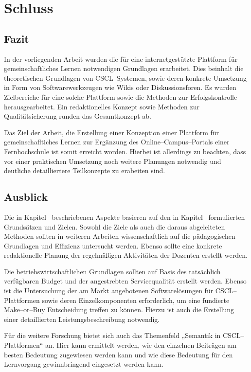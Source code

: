 \section{Schluss} %
\label{sec:schluss}

\subsection{Fazit} %
\label{sub:fazit}
In der vorliegenden Arbeit wurden die für eine internetgestützte Plattform für gemeinschaftliches Lernen notwendigen Grundlagen erarbeitet. Dies beinhalt die theoretischen Grundlagen von \ac{CSCL}–Systemen, sowie deren konkrete Umsetzung in Form von Softwarewerkzeugen wie Wikis oder Diskussionsforen. Es wurden Zielbereiche für eine solche Plattform sowie die Methoden zur Erfolgskontrolle herausgearbeitet. Ein redaktionelles Konzept sowie Methoden zur Qualitätsicherung runden das Gesamtkonzept ab.

Das Ziel der Arbeit, die Erstellung einer Konzeption einer Plattform für gemeinschafltiches Lernen zur Ergänzung des Online–Campus–Portals einer Fernhochschule ist somit erreicht worden. Hierbei ist allerdings zu beachten, dass vor einer praktischen Umsetzung noch weitere Planungen notwendig und deutliche detailliertere Teilkonzepte zu erabeiten sind. 

\subsection{Ausblick} %
\label{sub:ausblick}
Die in Kapitel~ beschriebenen Aspekte basieren auf den in Kapitel~ formulierten Grundsätzen und Zielen. Sowohl die Ziele als auch die daraus abgeleiteten Methoden sollten in weiteren Arbeiten wissenschaftlich auf die pädagogischen Grundlagen und Effizienz untersucht werden. Ebenso sollte eine konkrete redaktionelle Planung der regelmäßigen Aktivitäten der Dozenten erstellt werden.

Die betriebswirtschaftlichen Grundlagen sollten auf Basis des tatsächlich verfügbaren Budget und der angestrebten Servicequalität erstellt werden. Ebenso ist die Untersuchung der am Markt angebotenen Softwarelösungen für \ac{CSCL}–Plattformen sowie deren Einzelkomponenten erforderlich, um eine fundierte Make–or–Buy Entscheidung treffen zu können. Hierzu ist auch die Erstellung einer detaillierten Leistungsbeschreibung notwendig.

Für die weitere Forschung bietet sich auch das Themenfeld „Semantik in CSCL–Plattformen“ an. Hier kann ermittelt werden, wie den einzelnen Beiträgen am besten Bedeutung zugewiesen werden kann und wie diese Bedeutung für den Lernvorgang gewinnbringend eingesetzt werden kann.

